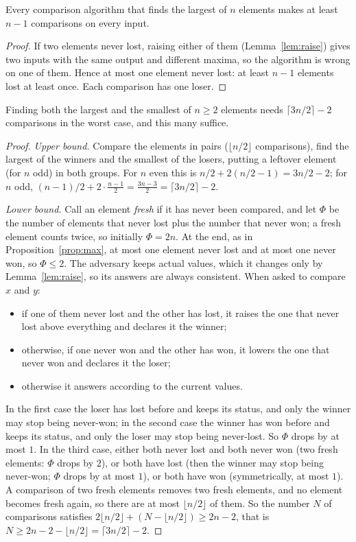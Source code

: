 \begin{proposition}\label{prop:max}
Every comparison algorithm that finds the largest of $n$ elements makes at least $n-1$ comparisons on every input.
\end{proposition}
\begin{proof}
If two elements never lost, raising either of them (Lemma~\ref{lem:raise}) gives two inputs with the same output and different maxima,
so the algorithm is wrong on one of them. Hence at most one element never lost: at least $n-1$ elements lost at least once. Each comparison
has one loser.
\end{proof}

\begin{theorem}[Pohl, 1972]\label{thm:maxmin}
Finding both the largest and the smallest of $n\ge2$ elements needs $\lceil3n/2\rceil-2$ comparisons in the worst case, and this many suffice.
\end{theorem}
\begin{proof}
\emph{Upper bound.} Compare the elements in pairs ($\lfloor n/2\rfloor$ comparisons), find the largest of the winners and the smallest of the losers,
putting a leftover element (for $n$ odd) in both groups. For $n$ even this is $n/2+2(n/2-1)=3n/2-2$; for $n$ odd, $(n-1)/2+2\cdot\frac{n-1}{2}=\frac{3n-3}{2}=\lceil3n/2\rceil-2$.

\emph{Lower bound.} Call an element \emph{fresh} if it has never been compared, and let $\Phi$ be the number of elements that never lost plus the
number that never won; a fresh element counts twice, so initially $\Phi=2n$. At the end, as in Proposition~\ref{prop:max}, at most one
element never lost and at most one never won, so $\Phi\le2$. The adversary keeps actual values, which it changes only by Lemma~\ref{lem:raise},
so its answers are always consistent. When asked to compare $x$ and $y$:
\begin{itemize}
\item if one of them never lost and the other has lost, it raises the one that never lost above everything and declares it the winner;
\item otherwise, if one never won and the other has won, it lowers the one that never won and declares it the loser;
\item otherwise it answers according to the current values.
\end{itemize}
In the first case the loser has lost before and keeps its status, and only the winner may stop being never-won; in the second case
the winner has won before and keeps its status, and only the loser may stop being never-lost. So $\Phi$ drops by at most $1$. In the third case, either both never lost and both never won (two fresh elements: $\Phi$ drops by $2$),
or both have lost (then the winner may stop being never-won; $\Phi$ drops by at most $1$), or both have won (symmetrically, at most $1$).
A comparison of two fresh elements removes two fresh elements, and no element becomes fresh again, so there are at most $\lfloor n/2\rfloor$ of them.
So the number $N$ of comparisons satisfies $2\lfloor n/2\rfloor+(N-\lfloor n/2\rfloor)\ge2n-2$, that is $N\ge2n-2-\lfloor n/2\rfloor=\lceil3n/2\rceil-2$.
\end{proof}

